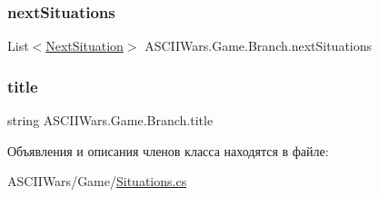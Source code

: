 \subsubsection{\texorpdfstring{next\+Situations}{nextSituations}}
{\footnotesize\ttfamily List$<$\hyperlink{class_a_s_c_i_i_wars_1_1_game_1_1_next_situation}{Next\+Situation}$>$ A\+S\+C\+I\+I\+Wars.\+Game.\+Branch.\+next\+Situations}

\hypertarget{class_a_s_c_i_i_wars_1_1_game_1_1_branch_aa1a7fc6d8ff84881ecea850ef481616d}{}\label{class_a_s_c_i_i_wars_1_1_game_1_1_branch_aa1a7fc6d8ff84881ecea850ef481616d} 
\subsubsection{\texorpdfstring{title}{title}}
{\footnotesize\ttfamily string A\+S\+C\+I\+I\+Wars.\+Game.\+Branch.\+title}



Объявления и описания членов класса находятся в файле\+:\begin{DoxyCompactItemize}
\item 
A\+S\+C\+I\+I\+Wars/\+Game/\hyperlink{_situations_8cs}{Situations.\+cs}\end{DoxyCompactItemize}
